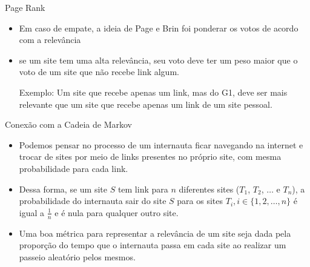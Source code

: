 \documentclass{beamer}
\begin{document}
\begin{frame}{Page Rank}
\begin{itemize}

\item Em caso de empate, a ideia de Page e Brin foi ponderar os votos de acordo com a relevância 

\item se um site tem uma alta relevância, seu voto deve ter um peso maior que o voto de um site que não recebe link algum.

\bigskip

\begin{center}
    Exemplo:
Um site que recebe apenas um link, mas do G1, deve ser mais relevante que um site que recebe apenas um link de um site pessoal.
\end{center}

\end{itemize}
\end{frame}
\begin{frame}{Conexão com a Cadeia de Markov}
\begin{itemize}

\item Podemos pensar no processo de um internauta ficar navegando na internet e trocar de sites por meio de links presentes no próprio site, com mesma probabilidade para cada link.

\vspace{2pt}

\item Dessa forma, se um site $S$ tem link para $n$ diferentes sites ($T_1$, $T_2$, $\dots$ e $T_n$), a probabilidade do internauta sair do site $S$ para os sites $T_i, i \in \{1, 2, \dots, n\}$ é igual a $\frac{1}{n}$ e é nula para qualquer outro site. 


\vspace{2pt}


\item Uma boa métrica para representar a relevância de um site seja dada pela proporção do tempo que o internauta passa em cada site ao realizar um passeio aleatório pelos mesmos.

\end{itemize}
\bigskip\end{frame}
\end{document}
